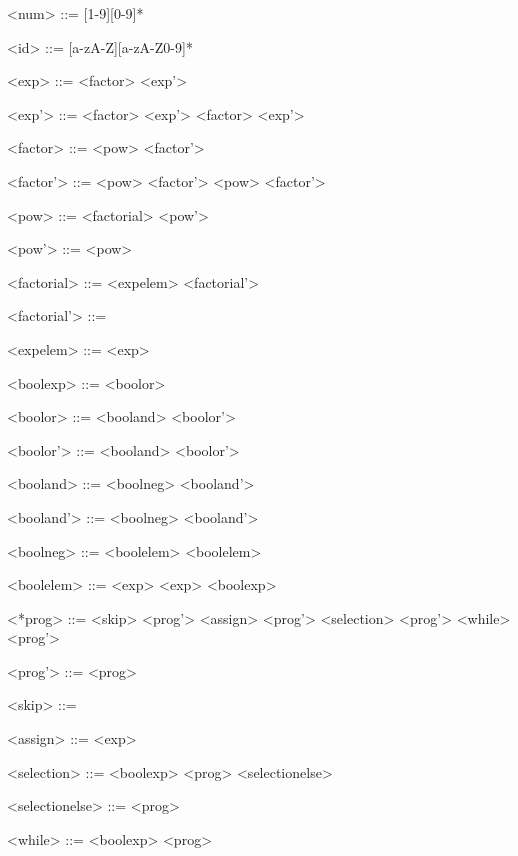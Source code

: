 \begin{grammarEx}
	<num> ::= [1-9][0-9]*
	
	<id> ::= [a-zA-Z][a-zA-Z0-9]*
	
	<exp> ::= <factor> <exp'> 
	
	<exp'> ::= \lit{+} <factor> <exp'> 
	\alt \lit{-} <factor> <exp'> 
	\alt \straightepsilon{} 
	
	<factor> ::= <pow> <factor'> 
	
	<factor'> ::= \lit{*} <pow> <factor'> 
	\alt \lit{/} <pow> <factor'> 
	\alt \straightepsilon{} 
	
	<pow> ::= <factorial> <pow'> 
	
	<pow'> ::= \lit{\^{}} <pow> 
	\alt \straightepsilon{} 
	
	<factorial> ::= <exp\textunderscore elem> <factorial'> 
	
	<factorial'> ::= \lit{!} 
	\alt \straightepsilon{} 
	
	<exp\textunderscore elem> ::=  
	\alt {} 
	\alt \lit{(} <exp> \lit{)} 
	
	<bool\textunderscore exp> ::= <bool\textunderscore or> 
	
	<bool\textunderscore or> ::= <bool\textunderscore and> <bool\textunderscore or'> 
	
	<bool\textunderscore or'> ::= \lit{\textbar\textbar} <bool\textunderscore and> <bool\textunderscore or'> 
	\alt \straightepsilon{} 
	
	<bool\textunderscore and> ::= <bool\textunderscore neg> <bool\textunderscore and'> 
	
	<bool\textunderscore and'> ::= \lit{\&\&} <bool\textunderscore neg> <bool\textunderscore and'> 
	\alt \straightepsilon{} 
	
	<bool\textunderscore neg> ::= <bool\textunderscore elem> 
	\alt \lit{\textasciitilde{}} <bool\textunderscore elem> 
	
	<bool\textunderscore elem> ::= <exp> \lit{\textless{}} <exp> 
	\alt {} 
	\alt \lit{[} <bool\textunderscore exp> \lit{]} 
	
	<*prog> ::= <skip> <prog'> 
	\alt <assign> <prog'> 
	\alt <selection> <prog'> 
	\alt <while> <prog'> 
	
	<prog'> ::= \lit{;} <prog> 
	\alt \straightepsilon{} 
	
	<skip> ::=  
	
	<assign> ::=  \lit{=} <exp> 
	
	<selection> ::=  <bool\textunderscore exp>  <prog> <selection\textunderscore else>  
	
	<selection\textunderscore else> ::=  <prog> 
	\alt \straightepsilon{} 
	
	<while> ::=  <bool\textunderscore exp>  <prog>  
\end{grammarEx}